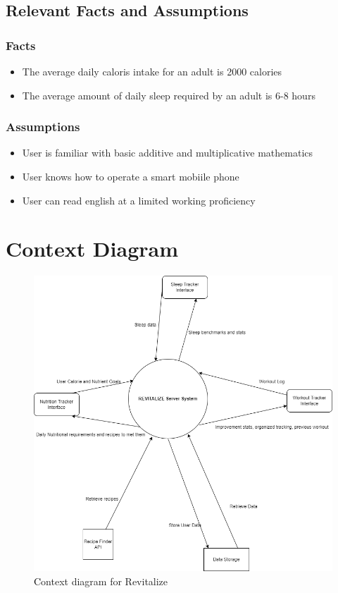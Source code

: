 \documentclass[12pt,letterpaper]{article}
\begin{document}
\subsection{Relevant Facts and Assumptions}
\subsubsection{Facts}
\begin{itemize}
\item The average daily caloris intake for an adult is 2000 calories
\item The average amount of daily sleep required by an adult is 6-8 hours
\end{itemize}

\subsubsection{Assumptions}
\begin{itemize}
\item User is familiar with basic additive and multiplicative mathematics
\item User knows how to operate a smart mobiile phone
\item User can read english at a limited working proficiency
\end{itemize}
\section{Context Diagram}
\begin{figure}[H]
\centering
\includegraphics[scale=0.5]{cont_diag.png}
\caption{\textcolor{black} Context diagram for Revitalize}
\end{figure}
\end{document}
